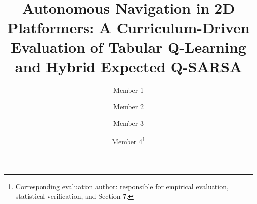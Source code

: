 \documentclass[runningheads]{llncs}
\begin{document}
\title{Autonomous Navigation in 2D Platformers: A Curriculum-Driven Evaluation of Tabular Q-Learning and Hybrid Expected Q-SARSA}

\author{Member 1 \and
Member 2 \and
Member 3 \and
Member 4\thanks{Corresponding evaluation author: responsible for empirical evaluation, statistical verification, and Section 7.}}



\maketitle






















\end{document}
